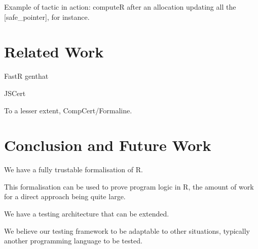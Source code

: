 \documentclass[10pt, acmart]{article}
\begin{document}
Example of tactic in action:
computeR after an allocation updating all the [safe_pointer], for instance.

\section{Related Work}
\label{sec:related:work}

FastR
genthat

JSCert

To a lesser extent, CompCert/Formaline.

\section{Conclusion and Future Work}
\label{sec:conclusion}

We have a fully trustable formalisation of R.

This formalisation can be used to prove program logic in R,
the amount of work for a direct approach being quite large.

We have a testing architecture that can be extended.

We believe our testing framework to be adaptable to other situations,
typically another programming language to be tested.

\printbibliography{}
\end{document}
